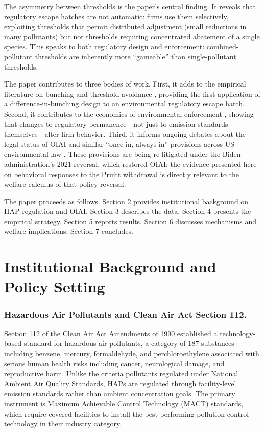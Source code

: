 \documentclass[12pt]{article}
\begin{document}
The asymmetry between thresholds is the paper's central finding. It reveals that regulatory escape hatches are not automatic: firms use them selectively, exploiting thresholds that permit distributed adjustment (small reductions in many pollutants) but not thresholds requiring concentrated abatement of a single species. This speaks to both regulatory design and enforcement: combined-pollutant thresholds are inherently more ``gameable'' than single-pollutant thresholds.

The paper contributes to three bodies of work. First, it adds to the empirical literature on bunching and threshold avoidance \citep{Kleven2016, NotowidigoRoth2021}, providing the first application of a difference-in-bunching design to an environmental regulatory escape hatch. Second, it contributes to the economics of environmental enforcement \citep{KohHaesungFischer2022, KeiserShapiro2019, SheridanBrunnersmith2020}, showing that changes to regulatory permanence---not just to emission standards themselves---alter firm behavior. Third, it informs ongoing debates about the legal status of OIAI and similar ``once in, always in'' provisions across US environmental law \citep{ELI2019}. These provisions are being re-litigated under the Biden administration's 2021 reversal, which restored OIAI; the evidence presented here on behavioral responses to the Pruitt withdrawal is directly relevant to the welfare calculus of that policy reversal.

The paper proceeds as follows. Section 2 provides institutional background on HAP regulation and OIAI. Section 3 describes the data. Section 4 presents the empirical strategy. Section 5 reports results. Section 6 discusses mechanisms and welfare implications. Section 7 concludes.

\section{Institutional Background and Policy Setting}

\subsubsection*{Hazardous Air Pollutants and Clean Air Act Section 112.}
Section 112 of the Clean Air Act Amendments of 1990 established a technology-based standard for hazardous air pollutants, a category of 187 substances including benzene, mercury, formaldehyde, and perchloroethylene associated with serious human health risks including cancer, neurological damage, and reproductive harm. Unlike the criteria pollutants regulated under National Ambient Air Quality Standards, HAPs are regulated through facility-level emission standards rather than ambient concentration goals. The primary instrument is Maximum Achievable Control Technology (MACT) standards, which require covered facilities to install the best-performing pollution control technology in their industry category.
\end{document}
